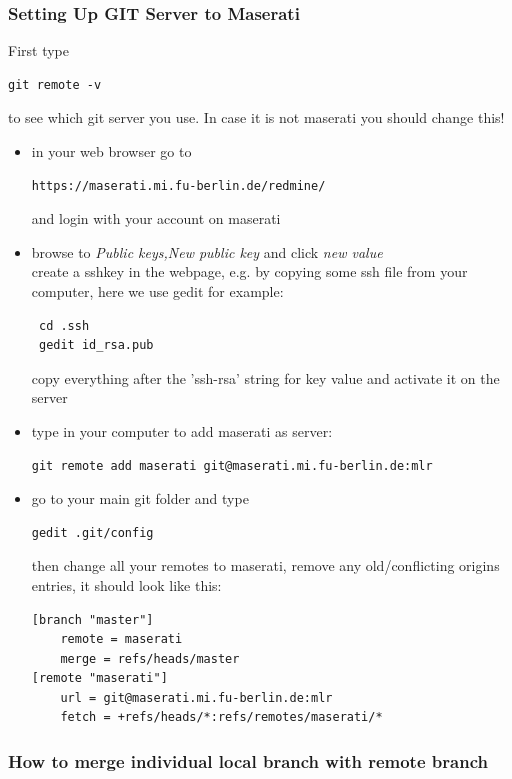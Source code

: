 \subsubsection{Setting Up GIT Server to Maserati}

First type
\begin{verbatim}
git remote -v 
\end{verbatim}
to see which git server you use. In case it is not maserati you should change this!

\begin{itemize}
\item in your web browser go to
\begin{verbatim}
https://maserati.mi.fu-berlin.de/redmine/
\end{verbatim}
and login with your account on maserati

\item  browse to \textit{Public keys,New public key} and click \textit{ new value}  \\
create a sshkey in the webpage, e.g. by copying some ssh file from your computer, here we use gedit for example:
 \begin{verbatim}
 cd .ssh 
 gedit id_rsa.pub
 \end{verbatim} 
 copy everything after the 'ssh-rsa' string for key value and activate it on the server
\item type in your computer to add maserati as server:
 \begin{verbatim}
git remote add maserati git@maserati.mi.fu-berlin.de:mlr 
 \end{verbatim}
\item 
go to your main git folder and type
 \begin{verbatim}
gedit .git/config
 \end{verbatim}
then change all your remotes to maserati, remove any old/conflicting origins entries, it should look like this:
 \begin{verbatim}
[branch "master"]
	remote = maserati
	merge = refs/heads/master
[remote "maserati"]
	url = git@maserati.mi.fu-berlin.de:mlr
	fetch = +refs/heads/*:refs/remotes/maserati/*
\end{verbatim}
	\end{itemize}


\subsubsection{How to merge individual local branch with remote branch}

